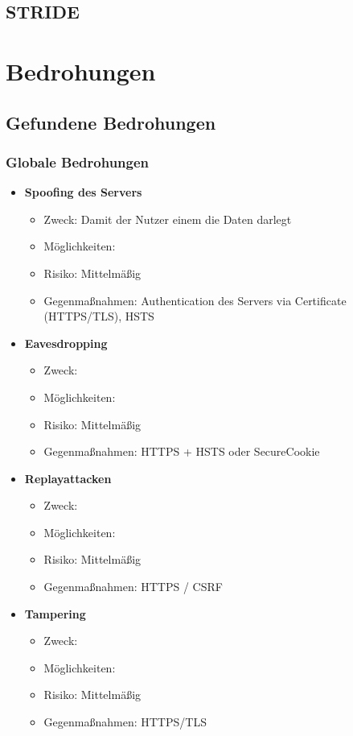 \documentclass[12pt,DIV14,BCOR10mm,a4paper,twoside,parskip=half-,headsepline,headinclude,english,ngerman,bibliography=totocnumbered]{scrreprt}
\begin{document}
\section{STRIDE}
\chapter{Bedrohungen}
\section{Gefundene Bedrohungen}

\subsection{Globale Bedrohungen}

\begin{itemize}
  \item \textbf{Spoofing des Servers}
  \begin{itemize}
  \item Zweck: Damit der Nutzer einem die Daten darlegt
  \item Möglichkeiten:
  \item Risiko: Mittelmäßig
  \item Gegenmaßnahmen: Authentication des Servers via Certificate (HTTPS/TLS), HSTS
  \end{itemize}

  \item \textbf{Eavesdropping}
  \begin{itemize}
  \item Zweck:
  \item Möglichkeiten:
  \item Risiko: Mittelmäßig
  \item Gegenmaßnahmen: HTTPS + HSTS oder SecureCookie
  \end{itemize}

  \item \textbf{Replayattacken}
  \begin{itemize}
  \item Zweck:
  \item Möglichkeiten:
  \item Risiko: Mittelmäßig
  \item Gegenmaßnahmen: HTTPS / CSRF
  \end{itemize}

  \item \textbf{Tampering}
  \begin{itemize}
  \item Zweck:
  \item Möglichkeiten:
  \item Risiko: Mittelmäßig
  \item Gegenmaßnahmen: HTTPS/TLS
  \end{itemize}


\end{itemize}
\end{document}
